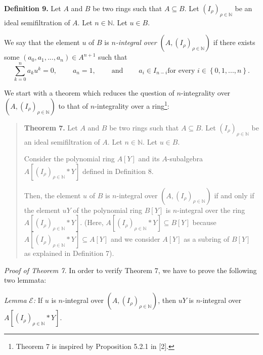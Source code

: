\documentclass[12pt,final,notitlepage,onecolumn]{article}%
\begin{document}
\textbf{Definition 9.} Let $A$ and $B$ be two rings such that $A\subseteq B$.
Let $\left(  I_{\rho}\right)  _{\rho\in\mathbb{N}}$ be an ideal semifiltration
of $A$. Let $n\in\mathbb{N}$. Let $u\in B$.

We say that the element $u$ of $B$ is $n$\textit{-integral over }$\left(
A,\left(  I_{\rho}\right)  _{\rho\in\mathbb{N}}\right)  $ if there exists some
$\left(  a_{0},a_{1},...,a_{n}\right)  \in A^{n+1}$ such that%
\[
\sum\limits_{k=0}^{n}a_{k}u^{k}=0,\ \ \ \ \ \ \ \ \ \ a_{n}%
=1,\ \ \ \ \ \ \ \ \ \ \text{and}\ \ \ \ \ \ \ \ \ \ a_{i}\in I_{n-i}\text{
for every }i\in\left\{  0,1,...,n\right\}  .
\]


We start with a theorem which reduces the question of $n$-integrality over
$\left(  A,\left(  I_{\rho}\right)  _{\rho\in\mathbb{N}}\right)  $ to that of
$n$-integrality over a ring\footnote{Theorem 7 is inspired by Proposition
5.2.1 in [2].}:

\begin{quote}
\textbf{Theorem 7.} Let $A$ and $B$ be two rings such that $A\subseteq B$. Let
$\left(  I_{\rho}\right)  _{\rho\in\mathbb{N}}$ be an ideal semifiltration of
$A$. Let $n\in\mathbb{N}$. Let $u\in B$.

Consider the polynomial ring $A\left[  Y\right]  $ and its $A$-subalgebra
$A\left[  \left(  I_{\rho}\right)  _{\rho\in\mathbb{N}}\ast Y\right]  $
defined in Definition 8.

Then, the element $u$ of $B$ is $n$-integral over $\left(  A,\left(  I_{\rho
}\right)  _{\rho\in\mathbb{N}}\right)  $ if and only if the element $uY$ of
the polynomial ring $B\left[  Y\right]  $ is $n$-integral over the ring
$A\left[  \left(  I_{\rho}\right)  _{\rho\in\mathbb{N}}\ast Y\right]  .$
(Here, $A\left[  \left(  I_{\rho}\right)  _{\rho\in\mathbb{N}}\ast Y\right]
\subseteq B\left[  Y\right]  $ because $A\left[  \left(  I_{\rho}\right)
_{\rho\in\mathbb{N}}\ast Y\right]  \subseteq A\left[  Y\right]  $ and we
consider $A\left[  Y\right]  $ as a subring of $B\left[  Y\right]  $ as
explained in Definition 7).
\end{quote}

\textit{Proof of Theorem 7.} In order to verify Theorem 7, we have to prove
the following two lemmata:

\textit{Lemma }$\mathcal{E}$\textit{:} If $u$ is $n$-integral over $\left(
A,\left(  I_{\rho}\right)  _{\rho\in\mathbb{N}}\right)  $, then $uY$ is
$n$-integral over $A\left[  \left(  I_{\rho}\right)  _{\rho\in\mathbb{N}}\ast
Y\right]  $.
\end{document}
